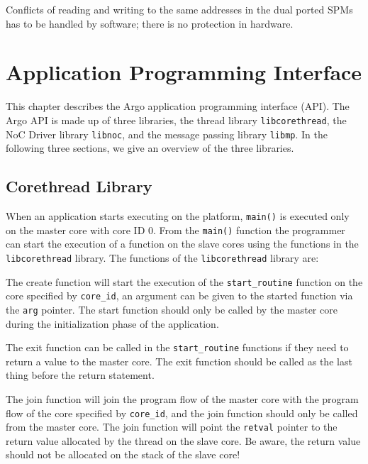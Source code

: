 \documentclass[a4paper,fontsize=10pt,twoside,DIV15,BCOR12mm,headinclude=true,footinclude=false,pagesize,bibtotoc]{scrbook}
\newcommand{\code}[1]{{\texttt{#1}}}
\renewenvironment{description}%
{
\begin{basedescript}{
\desclabelstyle{\nextlinelabel}
\renewcommand{\makelabel}[1]{%
\parbox[b]{\textwidth}{\bfseries##1}%
}%
\desclabelwidth{2em}}}
{
\end{basedescript}
}
\begin{document}
Conflicts of reading and writing to the same addresses in the dual
ported SPMs has to be handled by software; there is no protection in hardware.


\chapter{Application Programming Interface}
\label{chap:api}
This chapter describes the Argo application programming interface (API).
The Argo API is made up of three libraries, the thread library \code{libcorethread}, the NoC Driver library \code{libnoc}, and the message passing library \code{libmp}. In the following three sections, we give an overview of the three libraries.

\section{Corethread Library}
\label{sec:cthread}
When an application starts executing on the platform, \code{main()} is executed only on the master core with core ID 0.
From the \code{main()} function the programmer can start the execution of a function on the slave cores using the functions in the \code{libcorethread} library.
The functions of the \code{libcorethread} library are:
\begin{description}
\item[\code{int corethread\_create( int core\_id, void(*start\_routine)(void *), void *arg ) )}]

The create function will start the execution of the \code{start\_routine} function on the core specified by \code{core\_id}, an argument can be given to the started function via the \code{arg} pointer. The start function should only be called by the master core during the initialization phase of the application.

\item[\code{void corethread\_exit( void * retval )}]

The exit function can be called in the \code{start\_routine} functions if they need to return a value to the master core.
The exit function should be called as the last thing before the return statement.

\item[\code{int corethread\_join( int core\_id, void ** retval )}]

The join function will join the program flow of the master core with the program flow of the core specified by \code{core\_id}, and the join function should only be called from the master core. The join function will point the \code{retval} pointer to the return value allocated by the thread on the slave core. Be aware, the return value should not be allocated on the stack of the slave core!

\end{description}
\end{document}
